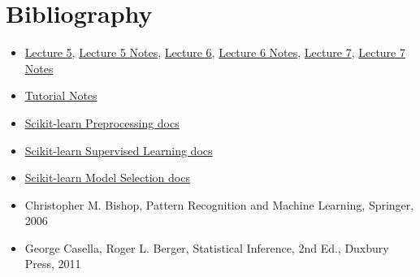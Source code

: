 \documentclass[a4paper]{article}
\begin{document}
\section{Bibliography}
\begin{itemize}
\item \href{http://aa.ssdi.di.fct.unl.pt/files/AA-05.pdf}{Lecture 5}, 
	\href{http://aa.ssdi.di.fct.unl.pt/files/AA-05_notes.pdf}{Lecture 5 Notes}, 
	\href{http://aa.ssdi.di.fct.unl.pt/files/AA-06.pdf}{Lecture 6}, 
	\href{http://aa.ssdi.di.fct.unl.pt/files/AA-06_notes.pdf}{Lecture 6 Notes}, 
	\href{http://aa.ssdi.di.fct.unl.pt/files/AA-07.pdf}{Lecture 7}, 
	\href{http://aa.ssdi.di.fct.unl.pt/files/AA-07_notes.pdf}{Lecture 7 Notes}\\
\item \href{http://aa.ssdi.di.fct.unl.pt/files/Tutorials.pdf}{Tutorial Notes}\\
\item \href{http://scikit-learn.org/stable/modules/preprocessing.html#preprocessing}{Scikit-learn Preprocessing docs}\\
\item \href{http://scikit-learn.org/stable/supervised_learning.html#supervised-learning}{Scikit-learn Supervised Learning docs}\\
\item \href{http://scikit-learn.org/stable/model_selection.html#model-selection}{Scikit-learn Model Selection docs}\\
\item Christopher M. Bishop, Pattern Recognition and Machine Learning, Springer, 2006
\item George Casella, Roger L. Berger, Statistical Inference, 2nd Ed., Duxbury Press, 2011
\end{itemize}
\end{document}
